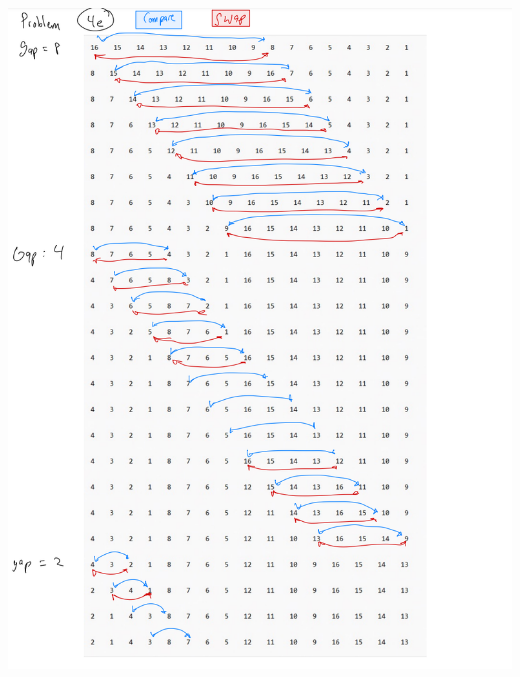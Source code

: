 \documentclass[11pt,largemargins]{homework}
\begin{document}
\begin{alphaparts}
  \includegraphics[width=1\textwidth]{hw1drawings/4e1.png}

\end{alphaparts}
\end{document}
